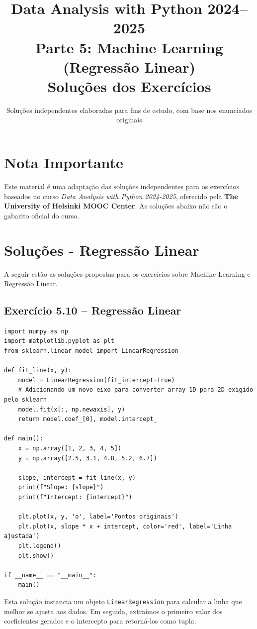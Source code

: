 \documentclass[11pt,a4paper]{article}
\title{\textbf{Data Analysis with Python 2024--2025}\\Parte 5: Machine Learning (Regressão Linear)\\\large Soluções dos Exercícios}
\author{Soluções independentes elaboradas para fins de estudo, com base nos enunciados originais}
\date{}
\begin{document}
\maketitle

\section*{Nota Importante}
Este material é uma adaptação das soluções independentes para os exercícios baseados no curso \textit{Data Analysis with Python 2024-2025}, oferecido pela \textbf{The University of Helsinki MOOC Center}. As soluções abaixo não são o gabarito oficial do curso.

\tableofcontents
\newpage

\section{Soluções - Regressão Linear}

A seguir estão as soluções propostas para os exercícios sobre Machine Learning e Regressão Linear.

\subsection*{Exercício 5.10 -- Regressão Linear}
\begin{solucao}
\begin{lstlisting}
import numpy as np
import matplotlib.pyplot as plt
from sklearn.linear_model import LinearRegression

def fit_line(x, y):
    model = LinearRegression(fit_intercept=True)
    # Adicionando um novo eixo para converter array 1D para 2D exigido pelo sklearn
    model.fit(x[:, np.newaxis], y)
    return model.coef_[0], model.intercept_

def main():
    x = np.array([1, 2, 3, 4, 5])
    y = np.array([2.5, 3.1, 4.8, 5.2, 6.7])
    
    slope, intercept = fit_line(x, y)
    print(f"Slope: {slope}")
    print(f"Intercept: {intercept}")
    
    plt.plot(x, y, 'o', label='Pontos originais')
    plt.plot(x, slope * x + intercept, color='red', label='Linha ajustada')
    plt.legend()
    plt.show()

if __name__ == "__main__":
    main()
\end{lstlisting}
Esta solução instancia um objeto \texttt{LinearRegression} para calcular a linha que melhor se ajusta aos dados. Em seguida, extraímos o primeiro valor dos coeficientes gerados e o intercepto para retorná-los como tupla.
\end{solucao}
\end{document}
